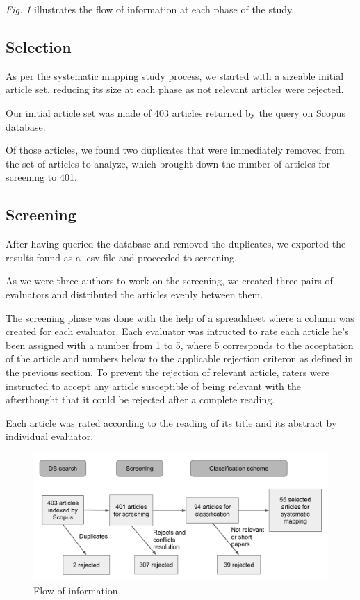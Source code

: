 \documentclass[letterpaper, 10 pt, conference]{ieeeconf}  %
\begin{document}
\textit{Fig. 1} illustrates the flow of information at each phase of the study.

\subsection{Selection}

As per the systematic mapping study process, we started with a sizeable initial
article set, reducing its size at each phase as not relevant articles were rejected.

Our initial article set was made of 403 articles returned by the query on Scopus
database.

Of those articles, we found two duplicates that were immediately removed from
the set of articles to analyze, which brought down the number of articles for
screening to 401.

\subsection{Screening}

After having queried the database and removed the duplicates, we exported the
results found as a .csv file and proceeded to screening.

As we were three authors to work on the screening, we created three pairs
of evaluators and distributed the articles evenly between them.

The screening phase was done with the help of a spreadsheet where a column was
created for each evaluator.
Each evaluator was intructed to rate each article he's been assigned with a number
from 1 to 5, where 5 corresponds to the acceptation of the article and numbers below
to the applicable rejection criteron as defined in the previous section.
To prevent the rejection of relevant article, raters were instructed to accept
any article susceptible of being relevant with the afterthought that it could be
rejected after a complete reading.

Each article was rated according to the reading of its title and its abstract by
individual evaluator.

\begin{figure}[tb]
 \centering
 \includegraphics[scale=0.5]{flow.png}
 \caption{Flow of information}
\end{figure}
\end{document}
